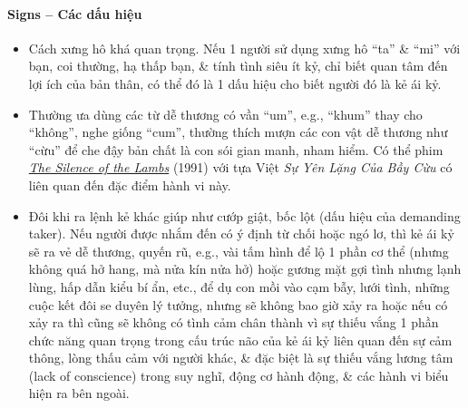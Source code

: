 \documentclass[12pt]{article}
\begin{document}
\paragraph{Signs -- Các dấu hiệu}
\begin{itemize}
	\item Cách xưng hô khá quan trọng. Nếu 1 người sử dụng xưng hô ``ta'' \& ``mi'' với bạn, coi thường, hạ thấp bạn, \& tính tình siêu ít kỷ, chỉ biết quan tâm đến lợi ích của bản thân, có thể đó là 1 dấu hiệu cho biết người đó là kẻ ái kỷ.
	\item Thường ưa dùng các từ dễ thương có vần ``um'', e.g., ``khum'' thay cho ``không'', nghe giống ``cum'', thường thích mượn các con vật dễ thương như ``cừu'' để che đậy bản chất là con sói gian manh, nham hiểm. Có thể phim \href{https://www.imdb.com/title/tt0102926}{\it The Silence of the Lambs} (1991) với tựa Việt {\it Sự Yên Lặng Của Bầy Cừu} có liên quan đến đặc điểm hành vi này.
	\item Đôi khi ra lệnh kẻ khác giúp như cướp giật, bốc lột (dấu hiệu của demanding taker). Nếu người được nhắm đến có ý định từ chối hoặc ngó lơ, thì kẻ ái kỷ sẽ ra vẻ dễ thương, quyến rũ, e.g., vài tấm hình để lộ 1 phần cơ thể (nhưng không quá hở hang, mà nửa kín nửa hở) hoặc gương mặt gợi tình nhưng lạnh lùng, hấp dẫn kiểu bí ẩn, etc., để dụ con mồi vào cạm bẫy, lưới tình, những cuộc kết đôi se duyên lý tưởng, nhưng sẽ không bao giờ xảy ra hoặc nếu có xảy ra thì cũng sẽ không có tình cảm chân thành vì sự thiếu vắng 1 phần chức năng quan trọng trong cấu trúc não của kẻ ái kỷ liên quan đến sự cảm thông, lòng thấu cảm với người khác, \& đặc biệt là sự thiếu vắng lương tâm (lack of conscience) trong suy nghĩ, động cơ hành động, \& các hành vi biểu hiện ra bên ngoài.
\end{itemize}
\end{document}
